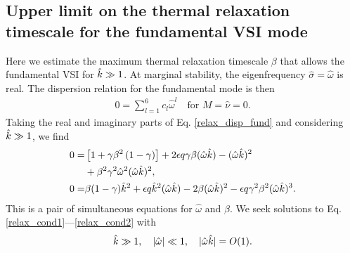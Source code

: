 
\subsection{Upper limit on the thermal relaxation timescale for the
  fundamental VSI mode}\label{iso_vsi_beta_crit}

Here we estimate the maximum thermal relaxation timescale
$\beta$ that allows the fundamental VSI for $\hat{k}\gg1$.   
At marginal stability, the eigenfrequency $\hat{\sigma}=\hat{\omega}$
is real. The dispersion relation for the fundamental mode is then
\begin{align}\label{relax_disp_fund}
  0 = \sum_{l=1}^{6}c_l\hat{\omega}^l \quad \text{for $M=\hat{\nu}=0$}.  
\end{align} 
Taking the real and imaginary parts of Eq. \ref{relax_disp_fund} and considering 
$\hat{k}\gg1$, we find
\begin{align}
  0 =& \left[1 + \gamma\beta^2\left(1-\gamma\right)\right] + 2\epsilon q
  \gamma\beta (\hat{\omega}\hat{k}) -  (\hat{\omega}\hat{k})^2 \notag\\
  &+ \beta^2\gamma^2\hat{\omega}^2 (\hat{\omega}\hat{k})^2,\label{relax_cond1}\\
  0=& \beta(1-\gamma)\hat{k}^2 + \epsilon q \hat{k}^2 (\hat{\omega}\hat{k})
  - 2\beta (\hat{\omega}\hat{k})^2 - \epsilon q \gamma^2\beta^2 (\hat{\omega}\hat{k})^3.\label{relax_cond2}
\end{align}
This is a pair of simultaneous equations for
$\hat{\omega}$ and $\beta$.  
We seek solutions to 
Eq. \ref{relax_cond1}---\ref{relax_cond2} with  
\begin{align}
  \hat{k} \gg1, \quad |\hat{\omega}|\ll 1 ,\quad
  |\hat{\omega}\hat{k}|=O(1). 
\end{align}

